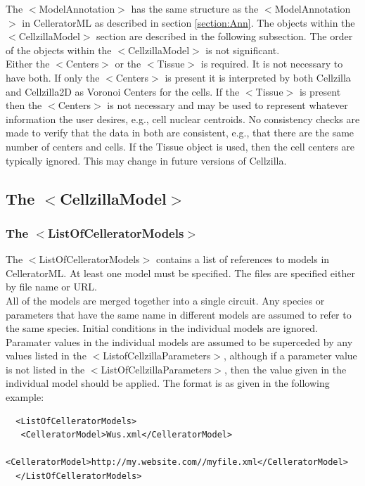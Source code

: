 \documentclass[12pt,letterpaper]{article}
\begin{document}
The {\ttfamily $<$ModelAnnotation$>$} has the same structure as the {\ttfamily $<$ModelAnnotation$>$} in CelleratorML as described in section \ref{section:Ann}. The objects within the {\ttfamily $<$CellzillaModel$>$} section are described in the following subsection. 
The order of the objects within the {\ttfamily $<$CellzillaModel$>$} is not significant.\\

Either the {\ttfamily $<$Centers$>$} or the {\ttfamily $<$Tissue$>$} is required. It is not necessary to have both. If only the {\ttfamily $<$Centers$>$} is present it is interpreted by both {\ttfamily Cellzilla} and {\ttfamily Cellzilla2D} as Voronoi Centers for the cells. If the {\ttfamily $<$Tissue$>$}  is present then the {\ttfamily $<$Centers$>$} is not necessary and may be used to represent whatever information the user desires, e.g., cell nuclear centroids. No consistency checks are made to verify that the data in both are consistent, e.g., that there are the same number of centers and cells. If the {\ttfamily Tissue} object is used, then the cell centers are typically ignored. This may change in future versions of {\ttfamily Cellzilla}. 

\subsection{The $<$CellzillaModel$>$}
\subsubsection{The $<$ListOfCelleratorModels$>$}

The $<$ListOfCelleratorModels$>$ contains a list of references to models in CelleratorML. At least one model must be specified. The files are specified either by file name or URL.\\

All of the models are merged together into a single circuit. Any species or parameters that have the same name in different models are assumed to refer to the same species. Initial conditions in the individual models are ignored. Paramater values in the individual models are assumed to be  superceded by any values listed in the $<$ListofCellzillaParameters$>$, although if a parameter value is not listed in the $<$ListOfCellzillaParameters$>$, then the value given in the individual model should be applied. The format is as given in the following example:

\begin{verbatim}
  <ListOfCelleratorModels>
   <CelleratorModel>Wus.xml</CelleratorModel>
   <CelleratorModel>http://my.website.com//myfile.xml</CelleratorModel>
  </ListOfCelleratorModels>
\end{verbatim}
\end{document}
